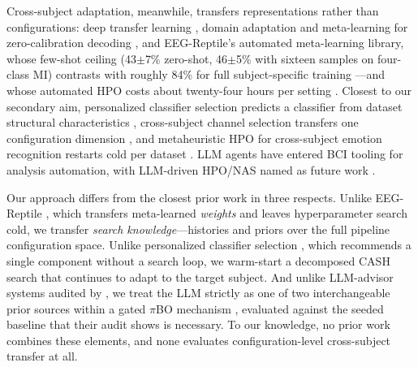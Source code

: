 Cross-subject adaptation, meanwhile, transfers representations rather than configurations: deep transfer learning \cite{SchirrmeisterEtAl2017, BirdEtAl2020, HuangEtAl2025}, domain adaptation and meta-learning for zero-calibration decoding \cite{AristimunhaEtAl2025}, and EEG-Reptile's automated meta-learning library, whose few-shot ceiling (43$\pm$7\% zero-shot, 46$\pm$5\% with sixteen samples on four-class MI) contrasts with roughly 84\% for full subject-specific training \cite{BerdyshevEtAl2024, SchirrmeisterEtAl2017}---and whose automated HPO costs about twenty-four hours per setting \cite{BerdyshevEtAl2024}. Closest to our secondary aim, personalized classifier selection predicts a classifier from dataset structural characteristics \cite{AnarakiEtAl2024}, cross-subject channel selection transfers one configuration dimension \cite{WeiEtAl2023}, and metaheuristic HPO for cross-subject emotion recognition restarts cold per dataset \cite{ZhangEtAl2024}. LLM agents have entered BCI tooling for analysis automation, with LLM-driven HPO/NAS named as future work \cite{KapitonovaBall2024}.


Our approach differs from the closest prior work in three respects. Unlike EEG-Reptile \cite{BerdyshevEtAl2024}, which transfers meta-learned \emph{weights} and leaves hyperparameter search cold, we transfer \emph{search knowledge}---histories and priors over the full pipeline configuration space. Unlike personalized classifier selection \cite{AnarakiEtAl2024}, which recommends a single component without a search loop, we warm-start a decomposed CASH search that continues to adapt to the target subject. And unlike LLM-advisor systems audited by \cite{RodriguesEtAl2026}, we treat the LLM strictly as one of two interchangeable prior sources within a gated $\pi$BO mechanism \cite{HvarfnerEtAl2022}, evaluated against the seeded baseline that their audit shows is necessary. To our knowledge, no prior work combines these elements, and none evaluates configuration-level cross-subject transfer at all.
